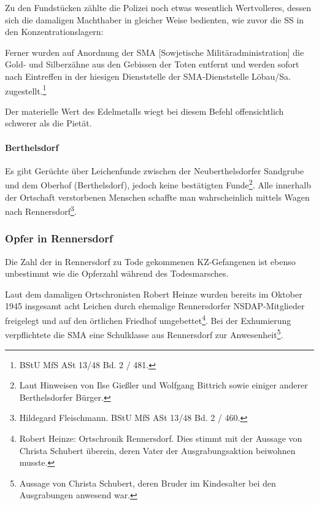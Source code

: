 Zu den Fundstücken zählte die Polizei noch etwas wesentlich Wertvolleres, dessen sich die damaligen Machthaber in gleicher Weise bedienten, wie zuvor die SS in den Konzentrationslagern:

\begin{leftbar} 
Ferner wurden auf Anordnung der SMA [Sowjetische Militäradministration] die Gold- und Silberzähne aus den Gebissen der Toten entfernt und werden sofort nach Eintreffen in der hiesigen Dienststelle der SMA-Dienststelle Löbau/Sa. zugestellt.\footnote{BStU MfS ASt 13/48 Bd. 2 / 481.}
\end{leftbar} 
Der materielle Wert des Edelmetalls wiegt bei diesem Befehl offensichtlich schwerer als die Pietät.

\paragraph{Berthelsdorf}
Es gibt Gerüchte über Leichenfunde zwischen der Neuberthelsdorfer Sandgrube und dem Oberhof (Berthelsdorf), jedoch keine bestätigten Funde\footnote{Laut Hinweisen von Ilse Gießler und Wolfgang Bittrich sowie einiger anderer Berthelsdorfer Bürger.}. Alle innerhalb der Ortschaft verstorbenen Menschen schaffte man wahrscheinlich mittels Wagen nach Rennersdorf\footnote{Hildegard Fleischmann. BStU MfS ASt 13/48 Bd. 2 / 460.}.


\subsubsection{Opfer in Rennersdorf}
Die Zahl der in Rennersdorf zu Tode gekommenen KZ-Gefangenen ist ebenso unbestimmt wie die Opferzahl während des Todesmarsches. 

Laut dem damaligen Ortschronisten Robert Heinze wurden bereits im Oktober 1945 insgesamt acht Leichen durch ehemalige Rennersdorfer NSDAP-Mitglieder freigelegt und auf den örtlichen Friedhof umgebettet\footnote{Robert Heinze: Ortschronik Rennersdorf. Dies stimmt mit der Aussage von Christa Schubert überein, deren Vater der Ausgrabungsaktion beiwohnen musste.}. Bei der Exhumierung verpflichtete die SMA eine Schulklasse aus Rennersdorf zur Anwesenheit\footnote{Aussage von Christa Schubert, deren Bruder im Kindesalter bei den Ausgrabungen anwesend war.}.


